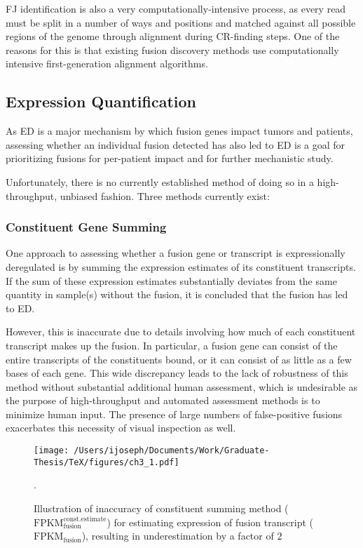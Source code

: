FJ identification is also a very computationally-intensive process, as every read must be split in a number of ways and positions and matched against all possible regions of the genome through alignment during CR-finding steps. One of the reasons for this is that existing fusion discovery methods use computationally intensive first-generation alignment algorithms. 

\subsection{Expression Quantification}

As ED is a major mechanism by which fusion genes impact tumors and patients, assessing whether an individual fusion detected has also led to ED is a goal for prioritizing fusions for per-patient impact and for further mechanistic study.

Unfortunately, there is no currently established method of doing so in a high-throughput, unbiased fashion. Three methods currently exist:

\subsubsection{Constituent Gene Summing}

One approach to assessing whether a fusion gene or transcript is expressionally deregulated is by summing the expression estimates of its constituent transcripts. If the sum of these expression estimates substantially deviates from the same quantity in sample(s) without the fusion, it is concluded that the fusion has led to ED.

However, this is inaccurate due to details involving how much of each constituent transcript makes up the fusion. In particular, a fusion gene can consist of the entire transcripts of the constituents bound, or it can consist of as little as a few bases of each gene. This wide discrepancy leads to the lack of robustness of this method without substantial additional human assessment, which is undesirable as the purpose of high-throughput and automated assessment methods is to minimize human input. The presence of large numbers of false-positive fusions exacerbates this necessity of visual inspection as well.

\begin{center}
\begin{figure}\centering
  \parbox{.9\textwidth}{\centering
\noindent \texttt{[image: /Users/ijoseph/Documents/Work/Graduate-Thesis/TeX/figures/ch3\_1.pdf]}
    \caption{Illustration of inaccuracy of constituent summing method ($\mathrm{FPKM}_{\mathrm{fusion}}^{\mathrm{const.estimate}}$) for estimating expression of fusion transcript ($\mathrm{FPKM}_\mathrm{fusion}$), resulting in underestimation by a factor of $2$ }}.
\end{figure}
\end{center}


